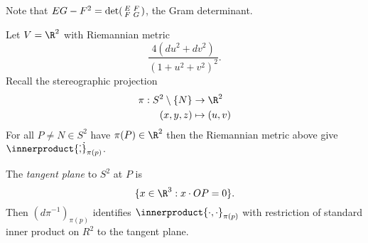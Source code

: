 \documentclass[a4paper]{article}
\theoremstyle{definition}
\newcommand*{\inner}{\innerproduct}
\begin{document}
Note that \(EG - F^2 = \det \begin{psmallmatrix} E & F \\ F & G \end{psmallmatrix}\), the Gram determinant.

\begin{eg}
  Let \(V = \R^2\) with Riemannian metric
  \[
    \frac{4 (du^2 + dv^2)}{(1 + u^2 + v^2)^2}.
  \]
  Recall the stereographic projection
  \begin{align*}
    \pi: S^2 \setminus \{N\} &\to \R^2 \\
    (x, y, z) &\mapsto (u, v)
  \end{align*}
  For all \(P \neq N \in S^2\) have \(\pi(P) \in \R^2\) then the Riemannian metric above give \(\inner{\dot, \dot}_{\pi(p)}\).

  The \emph{tangent plane} to \(S^2\) at \(P\) is
  \[
    \{x \in \R^3: x \cdot OP = 0\}.
  \]
  Then \((d\pi^{-1})_{\pi(p)}\) identifies \(\inner{\cdot, \cdot}_{\pi(p)}\) with restriction of standard inner product on \(R^2\) to the tangent plane.
\end{eg}






\printindex

\iffalse
Other courses that might be useful: topology, part of analysis II (differentiability in R^n and inverse function theorem)

Leads to: IID Differential Geometry

Reading List

P.\ Wilson, Curverd Spaces, CUP 2008
From classical geometries to elementary differential geometry
\fi
\end{document}
